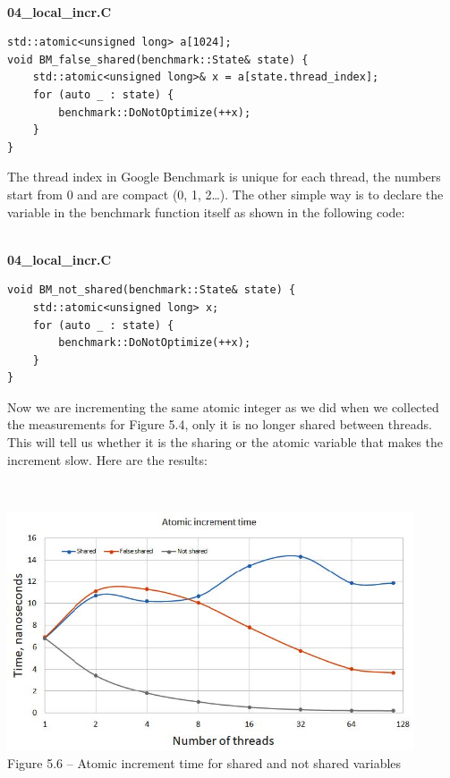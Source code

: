 \hspace*{\fill} \\ %
\noindent
\textbf{04\_local\_incr.C}
\begin{lstlisting}[style=styleCXX]
std::atomic<unsigned long> a[1024];
void BM_false_shared(benchmark::State& state) {
	std::atomic<unsigned long>& x = a[state.thread_index];
	for (auto _ : state) {
		benchmark::DoNotOptimize(++x);
	}
}
\end{lstlisting}

The thread index in Google Benchmark is unique for each thread, the numbers start from 0 and are compact (0, 1, 2…). The other simple way is to declare the variable in the benchmark function itself as shown in the following code:

\hspace*{\fill} \\ %
\noindent
\textbf{04\_local\_incr.C}
\begin{lstlisting}[style=styleCXX]
void BM_not_shared(benchmark::State& state) {
	std::atomic<unsigned long> x;
	for (auto _ : state) {
		benchmark::DoNotOptimize(++x);
	}
}
\end{lstlisting}

Now we are incrementing the same atomic integer as we did when we collected the measurements for Figure 5.4, only it is no longer shared between threads. This will tell us whether it is the sharing or the atomic variable that makes the increment slow. Here are the results:

\hspace*{\fill} \\ %
\begin{center}
\includegraphics[width=0.9\textwidth]{content/1/chapter5/images/6.jpg}\\
Figure 5.6 – Atomic increment time for shared and not shared variables
\end{center}

